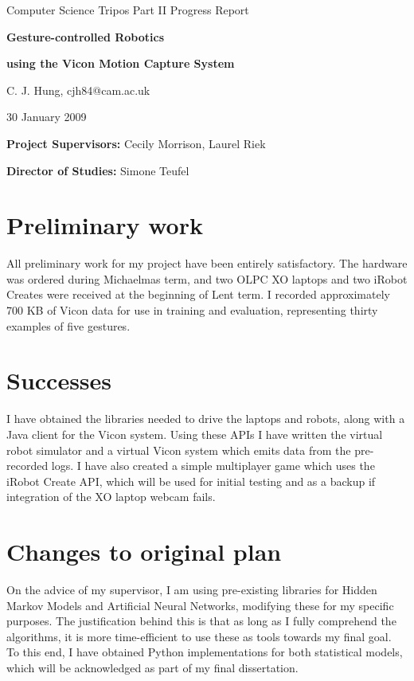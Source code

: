 \vfil

\centerline{\Large Computer Science Tripos Part II Progress Report}
\vspace{0.4in}
\centerline{\Large \bf{Gesture-controlled Robotics}}
\vspace{0.1in}
\centerline{\Large \bf{using the Vicon Motion Capture System}}
\vspace{0.5in}
\centerline{\large C. J. Hung, cjh84@cam.ac.uk}
\vspace{0.2in}
\centerline{\large 30 January 2009}

\vspace{0.2in}

\noindent
{\bf Project Supervisors:} Cecily Morrison, Laurel Riek

\vspace{0.2in}

\noindent
{\bf Director of Studies:} Simone Teufel

\vspace{0.5in}

\section*{Preliminary work} All preliminary work for my project have been entirely satisfactory. The hardware was ordered during Michaelmas term, and two OLPC XO laptops and two iRobot Creates were received at the beginning of Lent term. I recorded approximately 700 KB of Vicon data for use in training and evaluation, representing thirty examples of five gestures.

\section*{Successes} I have obtained the libraries needed to drive the laptops and robots, along with a Java client for the Vicon system. Using these APIs I have written the virtual robot simulator and a virtual Vicon system which emits data from the pre-recorded logs. I have also created a simple multiplayer game which uses the iRobot Create API, which will be used for initial testing and as a backup if integration of the XO laptop webcam fails.

\section*{Changes to original plan} On the advice of my supervisor, I am using pre-existing libraries for Hidden Markov Models and Artificial Neural Networks, modifying these for my specific purposes. The justification behind this is that as long as I fully comprehend the algorithms, it is more time-efficient to use these as tools towards my final goal. To this end, I have obtained Python implementations for both statistical models, which will be acknowledged as part of my final dissertation.

